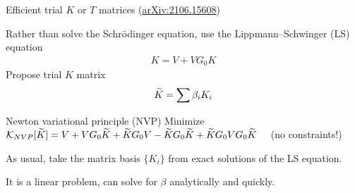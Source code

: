 \documentclass[xcolor=dvipsnames, aspectratio=169]{beamer}
\begin{document}
\begin{frame}{Efficient trial $K$ or $T$ matrices (\alert{\href{https://arxiv.org/abs/2106.15608}{arXiv:2106.15608}})}

Rather than solve the Schr{\"o}dinger equation, use the Lippmann--Schwinger (LS) equation
\begin{align*}
    K = V + V G_0 K
\end{align*}
Propose \alert{trial $K$ matrix}
\begin{align*}
    \widetilde{K} = \sum \beta_i K_i
\end{align*}

\begin{myblock}[valign=center]{Newton variational principle (NVP)}
Minimize $\mathcal{K}_{NVP}[\widetilde{K}] = V + V G_0 \widetilde{K} + \widetilde{K} G_0 V - \widetilde{K} G_0 \widetilde{K} + \widetilde{K} G_0 V G_0 \widetilde{K}$ ~~(no constraints!)
\end{myblock}%

As usual, take the \alert{matrix basis} $\{K_i\}$ from exact solutions of the LS equation.

It is a linear problem, can solve for $\beta$ analytically and quickly.

\end{frame}
\end{document}
